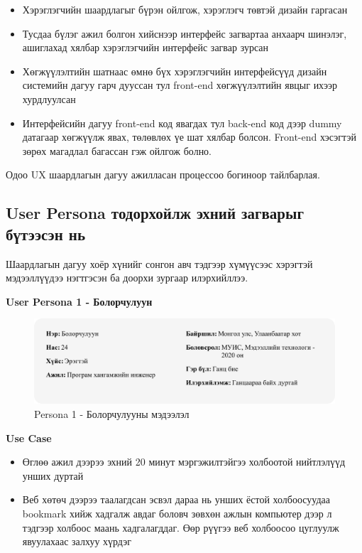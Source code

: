 \begin{itemize}
	\item Хэрэглэгчийн шаардлагыг бүрэн ойлгож, хэрэглэгч төвтэй дизайн гаргасан
	\item Тусдаа бүлэг ажил болгон хийснээр интерфейс загвартаа анхаарч шинэлэг, ашиглахад хялбар хэрэглэгчийн интерфейс загвар зурсан
	\item Хөгжүүлэлтийн шатнаас өмнө бүх хэрэглэгчийн интерфейсүүд дизайн системийн дагуу гарч дууссан тул front-end хөгжүүлэлтийн явцыг ихээр хурдлуулсан
	\item Интерфейсийн дагуу front-end код явагдах тул back-end код дээр dummy датагаар хөгжүүлж явах, төлөвлөх үе шат хялбар болсон. Front-end хэсэгтэй зөрөх магадлал багассан гэж ойлгож болно.
\end{itemize}

Одоо UX шаардлагын дагуу ажилласан процессоо богиноор тайлбарлая.

\subsection{User Persona тодорхойлж эхний загварыг бүтээсэн нь}

Шаардлагын дагуу хоёр хүнийг сонгон авч тэдгээр хүмүүсээс хэрэгтэй мэдээллүүдээ нэгтгэсэн ба доорхи зургаар илэрхийллээ.

\textbf{User Persona 1 - Болорчулуун}

\begin{figure}[h]
	\centering
	\includegraphics[width=15cm]{images/persona1-bolorchuluun.png}
	\caption{Persona 1 - Болорчулууны мэдээлэл}
	\label{fig:persona1}
\end{figure}

\textbf{Use Case}

\begin{itemize}
	\item Өглөө ажил дээрээ эхний 20 минут мэргэжилтэйгээ холбоотой нийтлэлүүд унших дуртай
	\item Веб хөтөч дээрээ таалагдсан эсвэл дараа нь унших ёстой холбоосуудаа bookmark хийж хадгалж авдаг боловч зөвхөн ажлын компьютер дээр л тэдгээр холбоос маань хадгалагддаг. Өөр рүүгээ веб холбоосоо цуглуулж явуулахаас залхуу хүрдэг
\end{itemize}

